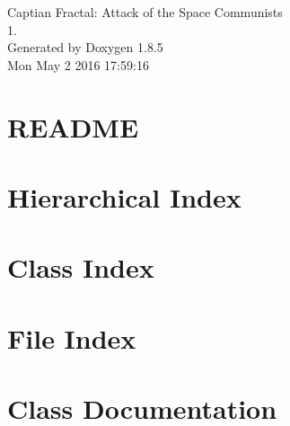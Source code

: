 \documentclass[twoside]{book}
\newcommand{\clearemptydoublepage}{%
  \newpage{\pagestyle{empty}\cleardoublepage}%
}
\begin{document}
\hypersetup{pageanchor=false}
\begin{titlepage}
\vspace*{7cm}
\begin{center}%
{\Large Captian Fractal\-: Attack of the Space Communists \\[1ex]\large 1. }\\
\vspace*{1cm}
{\large Generated by Doxygen 1.8.5}\\
\vspace*{0.5cm}
{\small Mon May 2 2016 17:59:16}\\
\end{center}
\end{titlepage}
\clearemptydoublepage
\tableofcontents
\clearemptydoublepage
{}
\hypersetup{pageanchor=true}

\chapter{R\-E\-A\-D\-M\-E}
\label{md__r_e_a_d_m_e}
\hypertarget{md__r_e_a_d_m_e}{}

\chapter{Hierarchical Index}

\chapter{Class Index}

\chapter{File Index}

\chapter{Class Documentation}






























\end{document}
